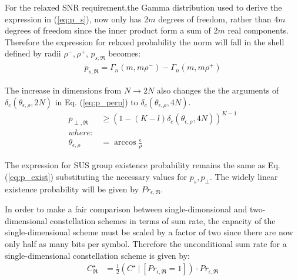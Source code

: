For the relaxed SNR requirement,the Gamma distribution used to derive the expression in (\ref{eq:p_s}), now only has 2$m$ degrees of freedom, rather than 4$m$ degrees of freedom since the inner product form a sum of 2$m$ real components. Therefore the expression for relaxed probability the norm will fall in the shell defined by radii $\rho^-,\rho^+$, $p_{s,\mathfrak{R}}$ becomes:
\begin{equation}\label{eq:p_s_real}
    \begin{aligned}
        p_{s,\mathfrak{R}} = \Gamma_n(m,m\rho^-) - \Gamma_n(m,m\rho^+)
    \end{aligned}
\end{equation}

The increase in dimensions from $N \rightarrow 2N$ also changes the the arguments of $\delta_c(\theta_{\epsilon,\rho},2N)$ in Eq. (\ref{eq:p_perp}) to $\delta_c(\theta_{\epsilon,\rho},4N)$.
\begin{equation}\label{eq:p_perp_real}
    \begin{aligned}
        p_{\perp,\mathfrak{R}} &\geq (1-(K-l)\delta_c(\theta_{\epsilon,\rho},4N))^{K-1}\\
        where:\\
        \theta_{\epsilon,\rho} &= \arccos\frac{\epsilon}{\rho}
    \end{aligned}
\end{equation}

The expression for SUS group existence probability remains the same as Eq. (\ref{eq:p_exist}) substituting the necessary values for $p_s,p_\perp$. The widely linear existence probability will be given by $Pr_{\epsilon,\mathfrak{R}}$.

In order to make a fair comparison between single-dimonsional and two-dimensional constellation schemes in terms of sum rate, the capacity of the single-dimensional scheme must be scaled by a factor of two since there are now only half as many bits per symbol. Therefore the unconditional sum rate for a single-dimensional constellation scheme is given by:
\begin{equation}\label{eq:sum_rate_real}
    \begin{aligned}
        C^{\star}_\mathfrak{R} &=  \frac{1}{2}(C^{\star} \ \vert \ [Pr_{\epsilon,\mathfrak{R}} = 1])\cdot Pr_{\epsilon,\mathfrak{R}}
    \end{aligned}
\end{equation}
